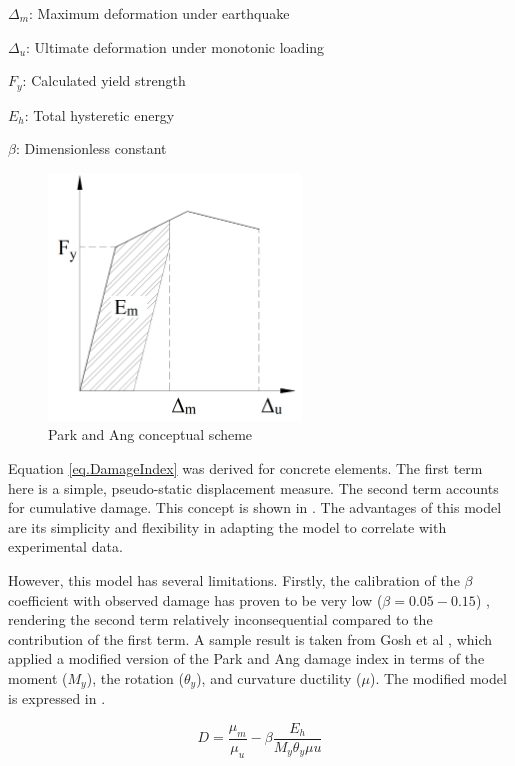 $\Delta_{m}$: Maximum deformation under earthquake

$\Delta_{u}$: Ultimate deformation under monotonic loading

$F_{y}$: Calculated yield strength

$E_{h}$: Total hysteretic energy

$\beta$: Dimensionless constant 

\begin{figure}[htbp]
\centering
\includegraphics[width=0.6\textwidth]{Chapter-2/figs/Park_and_Ang_Model}
\caption{Park and Ang conceptual scheme}
\label{fig:Paa}
\end{figure}

Equation \ref{eq.DamageIndex} was derived for concrete elements. The first term here is a simple, pseudo-static displacement measure. The second term accounts for cumulative damage. This concept is shown in . The advantages of this model are its simplicity and flexibility in adapting the model to correlate with experimental data.  

However, this model has several limitations. Firstly, the calibration of the $\beta$ coefficient with observed damage has proven to be very low ($\beta=0.05-0.15$) \cite{Young-JiPark1985} \cite{Ghosh2015}, rendering the second term relatively inconsequential compared to the contribution of the first term. A sample result is taken from Gosh et al \cite{Ghosh2015}, which applied a modified version of the Park and Ang damage index in terms of the moment ($M_{y}$), the rotation ($\theta_y$), and curvature ductility ($\mu$). The modified model is expressed in .

\begin{equation}
	D=\frac{\mu_{m}}{\mu_{u}}-\beta\frac{E_h}{M_{y}\theta_y\mu{u}}
	\label{eq.DamageIndexGhosh}
\end{equation}

